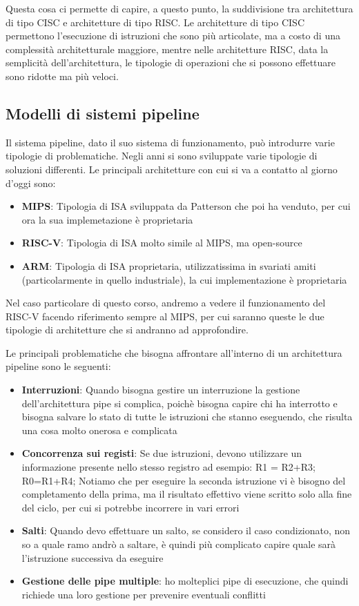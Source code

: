 Questa cosa ci permette di capire, a questo punto, la suddivisione tra architettura di tipo CISC e architetture di tipo RISC. Le architetture di tipo CISC permettono l'esecuzione di istruzioni che sono più articolate, ma a costo di una complessità architetturale maggiore, mentre nelle architetture RISC, data la semplicità dell'architettura, le tipologie di operazioni che si possono effettuare sono ridotte ma più veloci.

\subsection{Modelli di sistemi pipeline}
Il sistema pipeline, dato il suo sistema di funzionamento, può introdurre varie tipologie di problematiche. Negli anni si sono sviluppate varie tipologie di soluzioni differenti.
Le principali architetture con cui si va a contatto al giorno d'oggi sono:
\begin{itemize}
    \item \textbf{MIPS}: Tipologia di ISA sviluppata da Patterson che poi ha venduto, per cui ora la sua implemetazione è proprietaria
    \item \textbf{RISC-V}: Tipologia di ISA molto simile al MIPS, ma open-source
    \item \textbf{ARM}: Tipologia di ISA proprietaria, utilizzatissima in svariati amiti (particolarmente in quello industriale), la cui implementazione è proprietaria
\end{itemize}

Nel caso particolare di questo corso, andremo a vedere il funzionamento del RISC-V facendo riferimento sempre al MIPS, per cui saranno queste le due tipologie di architetture che si andranno ad approfondire.

Le principali problematiche che bisogna affrontare all'interno di un architettura pipeline sono le seguenti:
\begin{itemize}
    \item \textbf{Interruzioni}: Quando bisogna gestire un interruzione la gestione dell'architettura pipe si complica, poichè bisogna capire chi ha interrotto e bisogna salvare lo stato di tutte le istruzioni che stanno eseguendo, che risulta una cosa molto onerosa e complicata
    \item \textbf{Concorrenza sui registi}: Se due istruzioni, devono utilizzare un informazione presente nello stesso registro ad esempio: R1 = R2+R3; R0=R1+R4;  Notiamo che per eseguire la seconda istruzione vi è bisogno del completamento della prima, ma il risultato effettivo viene scritto solo alla fine del ciclo, per cui si potrebbe incorrere in vari errori
    \item \textbf{Salti}: Quando devo effettuare un salto, se considero il caso condizionato, non so a quale ramo andrò a saltare, è quindi più complicato capire quale sarà l'istruzione successiva da eseguire
    \item \textbf{Gestione delle pipe multiple}: ho molteplici pipe di esecuzione, che quindi richiede una loro gestione per prevenire eventuali conflitti
\end{itemize}

